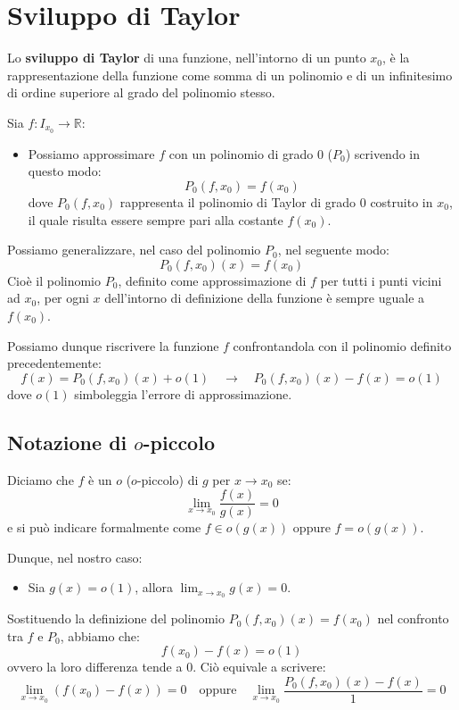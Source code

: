 \documentclass[12pt]{report}
\newcommand{\R}{\mathbb{R}}
\begin{document}
	\chapter{Sviluppo di Taylor}
	
	Lo \textbf{sviluppo di Taylor} di una funzione, nell'intorno di un punto $x_0$, è la rappresentazione della funzione come somma di un polinomio e di un infinitesimo di ordine superiore al grado del polinomio stesso.
	
	Sia $f: I_{x_0} \to \R$:
	\begin{itemize}
		
		\item Possiamo approssimare $f$ con un polinomio di grado $0$ ($P_0$) scrivendo in questo modo:
		\[
		P_0(f, x_0) = f(x_0)
		\]
		dove $P_0(f, x_0)$ rappresenta il polinomio di Taylor di grado $0$ costruito in $x_0$, il quale risulta essere sempre pari alla costante $f(x_0)$.
		
	\end{itemize}
	
	Possiamo generalizzare, nel caso del polinomio $P_0$, nel seguente modo:
	\[
	P_0(f, x_0)(x) = f(x_0)
	\]
	Cioè il polinomio $P_0$, definito come approssimazione di $f$ per tutti i punti vicini ad $x_0$, per ogni $x$ dell'intorno di definizione della funzione è sempre uguale a $f(x_0)$.
	
	Possiamo dunque riscrivere la funzione $f$ confrontandola con il polinomio definito precedentemente:
	\[
	f(x) = P_0(f, x_0)(x) + o(1) \quad \longrightarrow \quad P_0(f, x_0)(x) - f(x) = o(1)
	\]
	dove $o(1)$ simboleggia l'errore di approssimazione.
	
	\section{Notazione di $o$-piccolo}
	
	Diciamo che $f$ è un $o$ ($o$-piccolo) di $g$ per $x \to x_0$ se:
	\[
	\lim_{x \to x_0} \frac{f(x)}{g(x)} = 0
	\]
	e si può indicare formalmente come $f \in o(g(x))$ oppure $f = o(g(x))$.
	
	Dunque, nel nostro caso:
	\begin{itemize}
		
		\item Sia $g(x) = o(1)$, allora $\lim_{x \to x_0} g(x) = 0$.
		
	\end{itemize}
	
	Sostituendo la definizione del polinomio $P_0(f, x_0)(x) = f(x_0)$ nel confronto tra $f$ e $P_0$, abbiamo che:
	\[
	f(x_0) - f(x) = o(1)
	\]
	ovvero la loro differenza tende a $0$. Ciò equivale a scrivere:
	\[
	\lim_{x \to x_0} (f(x_0) - f(x)) = 0 \quad \text{oppure} \quad \lim_{x \to x_0} \frac{P_0(f, x_0)(x) - f(x)}{1} = 0
	\]
	
\end{document}
